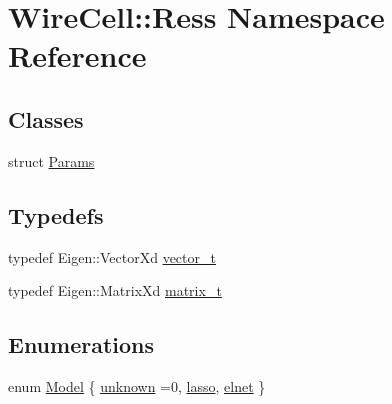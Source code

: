 \hypertarget{namespace_wire_cell_1_1_ress}{}\section{Wire\+Cell\+:\+:Ress Namespace Reference}
\label{namespace_wire_cell_1_1_ress}
\subsection*{Classes}
\begin{DoxyCompactItemize}
\item 
struct \hyperlink{struct_wire_cell_1_1_ress_1_1_params}{Params}
\end{DoxyCompactItemize}
\subsection*{Typedefs}
\begin{DoxyCompactItemize}
\item 
typedef Eigen\+::\+Vector\+Xd \hyperlink{namespace_wire_cell_1_1_ress_a4f1e55ff97c04ad9ff5530f3f5e8c453}{vector\+\_\+t}
\item 
typedef Eigen\+::\+Matrix\+Xd \hyperlink{namespace_wire_cell_1_1_ress_a42b8962e4f04a1258a3393990acda985}{matrix\+\_\+t}
\end{DoxyCompactItemize}
\subsection*{Enumerations}
\begin{DoxyCompactItemize}
\item 
enum \hyperlink{namespace_wire_cell_1_1_ress_abca29d9a906e0f4e9be142ff3b3b3573}{Model} \{ \hyperlink{namespace_wire_cell_1_1_ress_abca29d9a906e0f4e9be142ff3b3b3573aefec7adf6d17dbe0e6c93b42688fb531}{unknown} =0, 
\hyperlink{namespace_wire_cell_1_1_ress_abca29d9a906e0f4e9be142ff3b3b3573aecfa7e8c337e1903673044d7ace793b1}{lasso}, 
\hyperlink{namespace_wire_cell_1_1_ress_abca29d9a906e0f4e9be142ff3b3b3573a2b1f23a7622c659094509e0bb0843d86}{elnet}
 \}
\end{DoxyCompactItemize}
